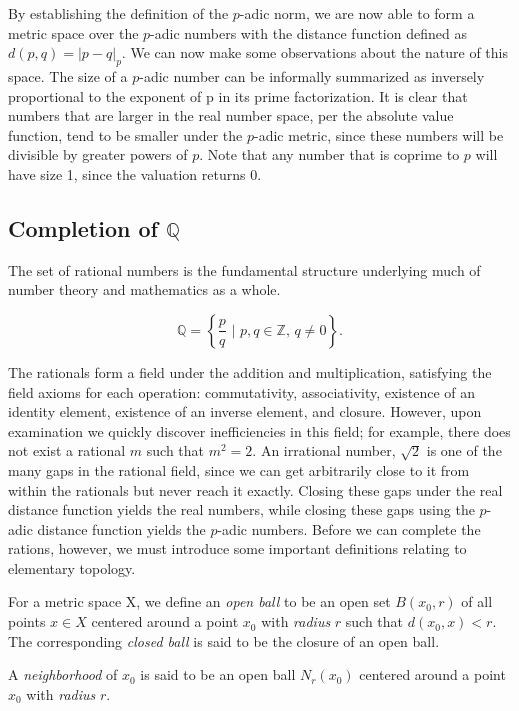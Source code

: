 \documentclass[a4paper]{article}
\begin{document}
By establishing the definition of the $p$-adic norm, we are now able to form a metric space over the $p$-adic numbers with the distance function defined as $d(p, q)= |p-q|_p$. We can now make some observations about the nature of this space. The size of a $p$-adic number can be informally summarized as inversely proportional to the exponent of p in its prime factorization. It is clear that numbers that are larger in the real number space, per the absolute value function, tend to be  smaller under the $p$-adic metric, since these numbers will be divisible by greater powers of $p$. Note that any number that is coprime to $p$ will have size 1, since the valuation returns 0. 


\subsection{Completion of $\mathbb{Q}$}

The set of rational numbers is the fundamental structure underlying much of number theory and mathematics as a whole.  

\[\mathbb{Q} = \left\{\frac{p}{q} \,\,| \,\, p,q \in \mathbb{Z},\, q \neq 0 \right\}.\]

The rationals form a field under the  addition and multiplication, satisfying the field axioms for each operation: commutativity, associativity, existence of an identity element, existence of an inverse element, and closure. However, upon examination we quickly discover inefficiencies in this field; for example, there does not exist a rational $m$ such that $m^2=2$. An irrational number, $\sqrt{2}$ is one of the many gaps in the rational field, since we can get arbitrarily close to it from within the rationals but never reach it exactly. Closing these gaps under the real distance function yields the real numbers, while closing these gaps using the $p$-adic distance function yields the $p$-adic numbers. Before we can complete the rations, however, we must introduce some important definitions relating to elementary topology.

\begin{definition}{}
For a metric space X, we define an \textit{open ball} to be an open set $B(x_0, r)$ of all points $x \in X$ centered around a point $x_0$ with \textit{radius} $r$ such that $d(x_0, x)<r$. The corresponding \textit{closed ball} is said to be the closure of an open ball.
\end{definition}

\begin{definition}{}
A \textit{neighborhood} of $x_0$ is said to be an open ball $N_r(x_0)$ centered around a point $x_0$ with \textit{radius} $r$.

\end{definition}
\end{document}
